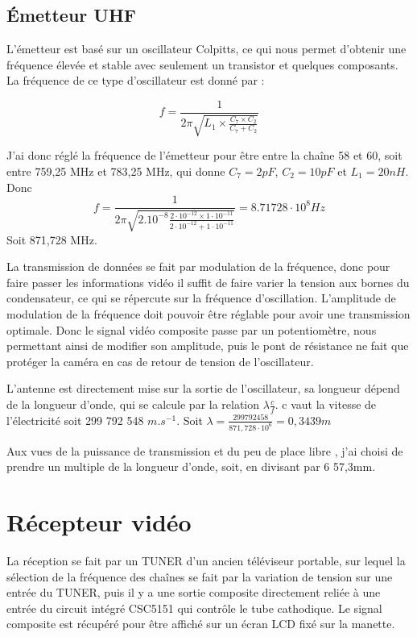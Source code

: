 \subsection{Émetteur UHF}

\begin{center}

\end{center}

L'émetteur est basé sur un oscillateur Colpitts, ce qui nous permet d'obtenir une fréquence élevée et stable avec seulement un transistor et quelques composants.
La fréquence de ce type d’oscillateur est donné par :

\[
f = \frac{1}{2\pi \sqrt{L_1 \times \frac{C_7 \times C_2}{C_7+C_2}}}
\]

J'ai donc réglé la fréquence de l'émetteur pour être entre la chaîne 58 et 60, soit entre  759,25 MHz
 et 783,25 MHz, qui donne $C_7 = 2pF$, $C_2 = 10pF$ et $L_1 = 20nH$. Donc
\[
f = \frac{1}{ 2 \pi \sqrt{ 2.10^{-8} \frac{2 \cdot 10^{-12} \times 1 \cdot 10^{-11}}{2 \cdot 10^{-12} + 1 \cdot 10^{-11}}}} = 8.71728 \cdot 10^8 Hz
\]
Soit 871,728 MHz.


La transmission de données se fait par modulation de la fréquence, donc pour faire passer  les informations vidéo il suffit de faire varier la tension aux bornes du condensateur, ce qui se répercute sur la fréquence d’oscillation. L'amplitude de modulation de la fréquence doit pouvoir être réglable pour avoir une transmission optimale.
Donc le signal vidéo composite passe par un potentiomètre, nous permettant ainsi de modifier son amplitude, puis le pont de résistance ne fait que protéger la caméra en cas de retour de tension de l'oscillateur.


L’antenne est directement mise sur la sortie de l'oscillateur, sa longueur dépend de la longueur d'onde, qui se calcule par la relation $\lambda \frac{c}{f}$.
c vaut la vitesse de l'électricité soit 299 792 548 $m.s^{-1}$. Soit $\lambda = \frac{299 792 458}{871,728 \cdot 10^6} = 0,3439 m $


Aux vues de la puissance de transmission et du peu de place libre , j'ai choisi de prendre un multiple de la longueur d'onde, soit, en divisant par 6 57,3mm.

\section{Récepteur vidéo}

La réception se fait par un TUNER d'un ancien téléviseur portable, sur lequel la sélection de la fréquence des chaînes se fait par la variation de tension sur une entrée du TUNER, puis il y a une sortie composite directement reliée à une entrée du circuit intégré CSC5151 qui contrôle le tube cathodique. Le signal composite est récupéré pour être affiché sur un écran LCD fixé sur la manette.